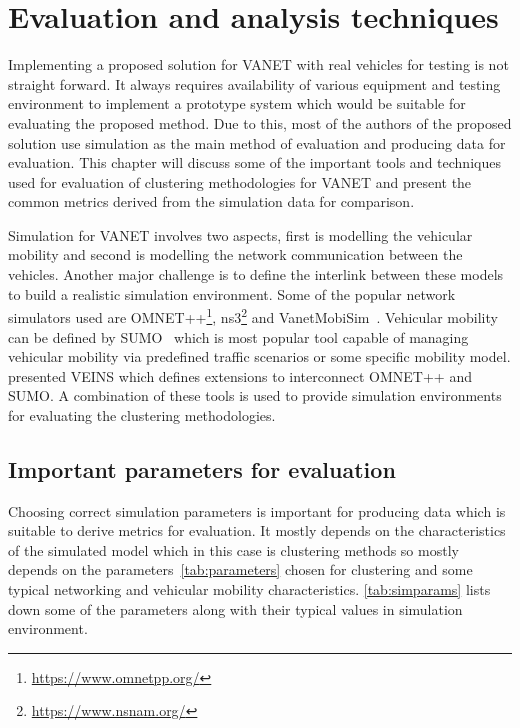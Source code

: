 \documentclass[]{ccs-thesis}
\begin{document}
\chapter{Evaluation and analysis techniques}
\label{sec:evaluation}

Implementing a proposed solution for \ac{VANET} with real vehicles for testing is not straight forward.
It always requires availability of various equipment and testing environment to implement a prototype system which
would be suitable for evaluating the proposed method. Due to this, most of the authors of the proposed solution use
simulation as the main method of evaluation and producing data for evaluation. This chapter will discuss some of
the important tools and techniques used for evaluation of clustering methodologies for \ac{VANET} and present
the common metrics derived from the simulation data for comparison.

Simulation for \ac{VANET} involves two aspects, first is modelling the vehicular mobility and second is modelling the
network communication between the vehicles. Another major challenge is to define the interlink between these models
to build a realistic simulation environment. Some of the popular network simulators used are OMNET++\footnote{\url{https://www.omnetpp.org/}},
ns3\footnote{\url{https://www.nsnam.org/}} and VanetMobiSim~\cite{4127230}. Vehicular mobility can be defined by SUMO~\cite{dlr71460}
which is most popular tool capable of managing vehicular mobility via predefined traffic scenarios or some specific mobility model.
\textcite{sommer2011bidirectionally} presented \ac{VEINS} which defines extensions to interconnect OMNET++ and SUMO. A combination of
these tools is used to provide simulation environments for evaluating the clustering methodologies.

\section{Important parameters for evaluation}

Choosing correct simulation parameters is important for producing data which is suitable to derive metrics for evaluation.
It mostly depends on the characteristics of the simulated model which in this case is clustering methods so mostly depends
on the parameters~\cref{tab:parameters} chosen for clustering and some typical networking and vehicular mobility
characteristics. \cref{tab:simparams} lists down some of the parameters along with their typical values in simulation environment.
\end{document}
